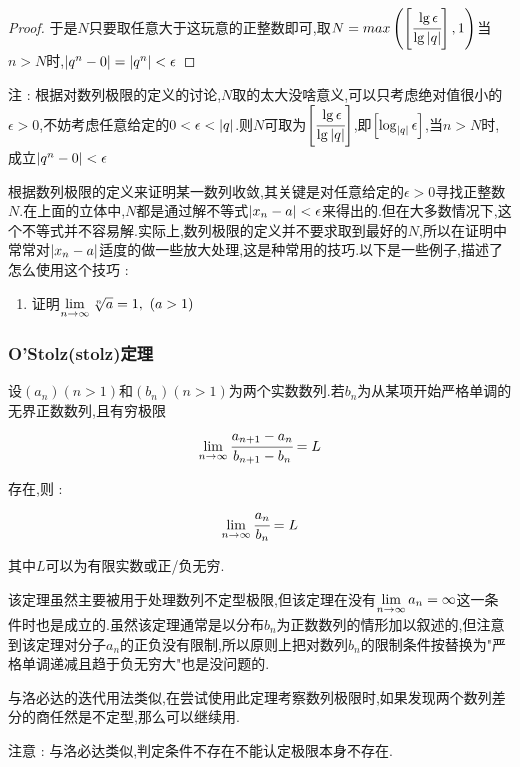 {{{{\begin{enumerate}
{\begin{proof}
                      于是$N$只要取任意大于这玩意的正整数即可,取$N = max\left(\left[\cfrac{\lg \epsilon}{\lg \left\lvert q \right\vert}\right],1\right)$当$n > N$时,$\left\lvert q^n - 0 \right\vert = \left\lvert q^n \right\vert < \epsilon$

                  \end{proof}

                  注 : 根据对数列极限的定义的讨论,$N$取的太大没啥意义,可以只考虑绝对值很小的$\epsilon > 0$,不妨考虑任意给定的$0 < \epsilon < \left\lvert q \right\vert$.则$N$可取为$\left[\cfrac{\lg \epsilon}{\lg \left\lvert q \right\vert}\right]$,即$\left[\log_{\left\lvert q \right\vert}\epsilon\right]$,当$n > N$时,成立$\left\lvert q^n - 0 \right\vert < \epsilon$
                  }
        \end{enumerate}

        根据数列极限的定义来证明某一数列收敛,其关键是对任意给定的$\epsilon > 0$寻找正整数$N$.在上面的立体中,$N$都是通过解不等式$\left\lvert x_n - a \right\vert < \epsilon$来得出的.但在大多数情况下,这个不等式并不容易解.实际上,数列极限的定义并不要求取到最好的$N$,所以在证明中常常对$\left\lvert x_n - a \right\vert$适度的做一些放大处理,这是种常用的技巧.以下是一些例子,描述了怎么使用这个技巧 :
        \begin{enumerate}
            \item {
                  证明$\lim\limits_{n \to \infty}\sqrt[n]{a} = 1,\ (a > 1)$

                  }
        \end{enumerate}
    }%

    \subsubsection{O'Stolz(stolz)定理}{
        设$(a_n)(n > 1)$和$(b_n)(n > 1)$为两个实数数列.若$b_n$为从某项开始严格单调的无界正数数列,且有穷极限
        $$
            \lim\limits_{n \to \infty}\cfrac{a_{n + 1} - a_n}{b_{n + 1} - b_n} = L
        $$

        存在,则 :
        $$
            \lim\limits_{n \to \infty}\cfrac{a_n}{b_n} = L
        $$

        其中$L$可以为有限实数或正/负无穷.

        该定理虽然主要被用于处理数列不定型极限,但该定理在没有$\lim\limits_{n \to \infty}a_n = \infty$这一条件时也是成立的.虽然该定理通常是以分布$b_n$为正数数列的情形加以叙述的,但注意到该定理对分子$a_n$的正负没有限制,所以原则上把对数列$b_n$的限制条件按替换为"严格单调递减且趋于负无穷大"也是没问题的.

        与洛必达的迭代用法类似,在尝试使用此定理考察数列极限时,如果发现两个数列差分的商任然是不定型,那么可以继续用.

        注意 : 与洛必达类似,判定条件不存在不能认定极限本身不存在.
    }%

}%

}%

}%